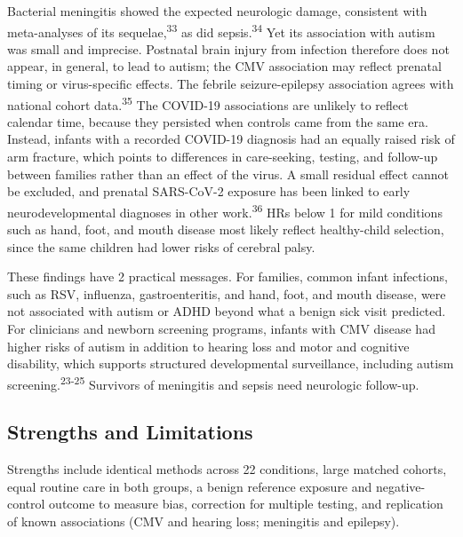 \documentclass[11pt]{article}
\begin{document}
Bacterial meningitis showed the expected neurologic damage, consistent with meta-analyses of its sequelae,\textsuperscript{33} as did sepsis.\textsuperscript{34} Yet its association with autism was
small and imprecise. Postnatal brain injury from infection therefore does not appear, in general, to lead to autism; the CMV association may reflect prenatal timing or virus-specific effects. The
febrile seizure-epilepsy association agrees with national cohort data.\textsuperscript{35} The COVID-19 associations are unlikely to reflect calendar time, because they persisted when controls came
from the same era. Instead, infants with a recorded COVID-19 diagnosis had an equally raised risk of arm fracture, which points to differences in care-seeking, testing, and follow-up between families
rather than an effect of the virus. A small residual effect cannot be excluded, and prenatal SARS-CoV-2 exposure has been linked to early neurodevelopmental diagnoses in other
work.\textsuperscript{36} HRs below 1 for mild conditions such as hand, foot, and mouth disease most likely reflect healthy-child selection, since the same children had lower risks of cerebral palsy.

These findings have 2 practical messages. For families, common infant infections, such as RSV, influenza, gastroenteritis, and hand, foot, and mouth disease, were not associated with autism or ADHD
beyond what a benign sick visit predicted. For clinicians and newborn screening programs, infants with CMV disease had higher risks of autism in addition to hearing loss and motor and cognitive
disability, which supports structured developmental surveillance, including autism screening.\textsuperscript{23-25} Survivors of meningitis and sepsis need neurologic follow-up.

\hypertarget{strengths-and-limitations}{%
\subsection*{Strengths and Limitations}\label{strengths-and-limitations}}

Strengths include identical methods across 22 conditions, large matched cohorts, equal routine care in both groups, a benign reference exposure and negative-control outcome to measure bias, correction
for multiple testing, and replication of known associations (CMV and hearing loss; meningitis and epilepsy).
\end{document}
